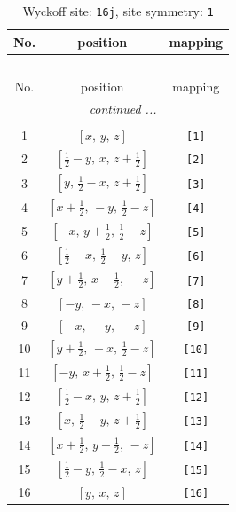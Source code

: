 \documentclass[fleqn,8pt]{jsarticle}
\begin{document}
\begin{longtable}{ccc}
\caption{Wyckoff site: {\tt 16j}, site symmetry: {\tt 1}}
 \\
 \hline \hline
No. & position & mapping \\ \hline \endfirsthead

\multicolumn{2}{l}{\tablename\ \thetable{}} \\
 \hline \hline
No. & position & mapping \\ \hline \endhead

 \hline \hline
\multicolumn{2}{r}{\footnotesize\it continued ...} \\ \endfoot

 \hline \hline
\multicolumn{2}{r}{} \\ \endlastfoot

1 & $\left[ x,\, y,\, z \right]$ & {\tt [1]} \\ \hline
2 & $\left[ \frac{1}{2} - y,\, x,\, z + \frac{1}{2} \right]$ & {\tt [2]} \\ \hline
3 & $\left[ y,\, \frac{1}{2} - x,\, z + \frac{1}{2} \right]$ & {\tt [3]} \\ \hline
4 & $\left[ x + \frac{1}{2},\, - y,\, \frac{1}{2} - z \right]$ & {\tt [4]} \\ \hline
5 & $\left[ - x,\, y + \frac{1}{2},\, \frac{1}{2} - z \right]$ & {\tt [5]} \\ \hline
6 & $\left[ \frac{1}{2} - x,\, \frac{1}{2} - y,\, z \right]$ & {\tt [6]} \\ \hline
7 & $\left[ y + \frac{1}{2},\, x + \frac{1}{2},\, - z \right]$ & {\tt [7]} \\ \hline
8 & $\left[ - y,\, - x,\, - z \right]$ & {\tt [8]} \\ \hline
9 & $\left[ - x,\, - y,\, - z \right]$ & {\tt [9]} \\ \hline
10 & $\left[ y + \frac{1}{2},\, - x,\, \frac{1}{2} - z \right]$ & {\tt [10]} \\ \hline
11 & $\left[ - y,\, x + \frac{1}{2},\, \frac{1}{2} - z \right]$ & {\tt [11]} \\ \hline
12 & $\left[ \frac{1}{2} - x,\, y,\, z + \frac{1}{2} \right]$ & {\tt [12]} \\ \hline
13 & $\left[ x,\, \frac{1}{2} - y,\, z + \frac{1}{2} \right]$ & {\tt [13]} \\ \hline
14 & $\left[ x + \frac{1}{2},\, y + \frac{1}{2},\, - z \right]$ & {\tt [14]} \\ \hline
15 & $\left[ \frac{1}{2} - y,\, \frac{1}{2} - x,\, z \right]$ & {\tt [15]} \\ \hline
16 & $\left[ y,\, x,\, z \right]$ & {\tt [16]} \\
\end{longtable}
\end{document}
